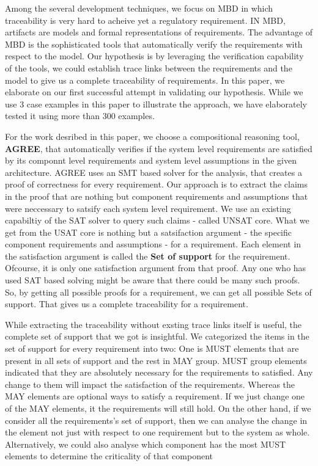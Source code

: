 Among the several development techniques, we focus on MBD in which traceability is very hard to acheive yet a regulatory requirement. IN MBD, artifacts are models and formal representations of requirements. The advantage of MBD is the sophisticated tools that automatically verify the requirements with respect to the model. Our hypothesis is by leveraging the verification capability of the tools, we could establish trace links between the requirements and the model to give us a complete traceability of requirements. In this paper, we elaborate on our first successful attempt in validating our hypothesis. While we use 3 case examples in this paper to illustrate the approach, we have elaborately tested it using more than 300 examples.

For the work desribed in this paper, we choose a compositional reasoning tool, \textbf{AGREE}, that automatically verifies if the system level requirements are satisfied by its componnt level requirements and system level assumptions in the given architecture. AGREE uses an SMT based solver for the analysis, that creates a proof of correctness for every requirement. Our approach is to extract the claims in the proof that are nothing but component requirements and assumptions that were neccessary to satsify each system level requirement. We use an existing capabiltiy of the SAT solver to query such claims - called UNSAT core. What we get from the USAT core is nothing but a satsifaction argument - the specific component requirements and assumptions - for a requirement. Each element in the satisfaction argument is called the\textbf{ Set of support }for the requirement.  Ofcourse, it is only one satisfaction argument from that proof. Any one who has used SAT based solving might be aware that there could be many such proofs. So, by getting all possible proofs for a requirement, we can get all possible Sets of support. That gives us a complete traceability for a requirement.

While extracting the traceability without exsting trace links itself is useful, the complete set of support that we got is insightful. We categorized the items in the set of support for every requirement into two: One is MUST elements that are present in all sets of support and the rest in MAY group. MUST group elements indicated that they are absolutely necessary for the requirements to satisfied. Any change to them will impact the satisfaction of the requirements. Whereas the MAY elements are optional ways to satisfy a requirement. If we just change one of the MAY elements, it the requirements will still hold. On the other hand, if we consider all the requirements's set of support, then we can analyse the change in the element not just with respect to one requirement but to the system as whole. Alternatively, we could also analyse which component has the most MUST elements to determine the criticality of that component



